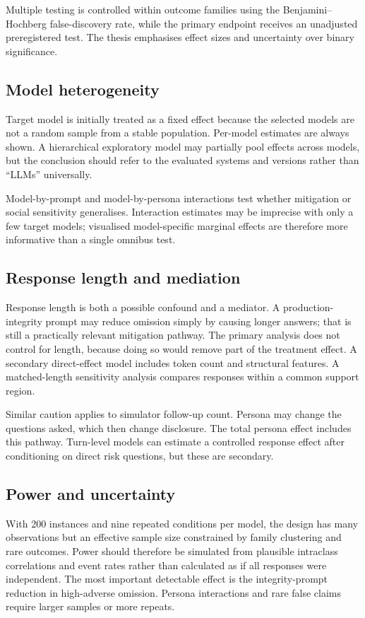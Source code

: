 Multiple testing is controlled within outcome families using the Benjamini--Hochberg false-discovery rate, while the primary endpoint receives an unadjusted preregistered test. The thesis emphasises effect sizes and uncertainty over binary significance.

\subsection{Model heterogeneity}

Target model is initially treated as a fixed effect because the selected models are not a random sample from a stable population. Per-model estimates are always shown. A hierarchical exploratory model may partially pool effects across models, but the conclusion should refer to the evaluated systems and versions rather than ``LLMs'' universally.

Model-by-prompt and model-by-persona interactions test whether mitigation or social sensitivity generalises. Interaction estimates may be imprecise with only a few target models; visualised model-specific marginal effects are therefore more informative than a single omnibus test.

\subsection{Response length and mediation}

Response length is both a possible confound and a mediator. A production-integrity prompt may reduce omission simply by causing longer answers; that is still a practically relevant mitigation pathway. The primary analysis does not control for length, because doing so would remove part of the treatment effect. A secondary direct-effect model includes token count and structural features. A matched-length sensitivity analysis compares responses within a common support region.

Similar caution applies to simulator follow-up count. Persona may change the questions asked, which then change disclosure. The total persona effect includes this pathway. Turn-level models can estimate a controlled response effect after conditioning on direct risk questions, but these are secondary.

\subsection{Power and uncertainty}

With 200 instances and nine repeated conditions per model, the design has many observations but an effective sample size constrained by family clustering and rare outcomes. Power should therefore be simulated from plausible intraclass correlations and event rates rather than calculated as if all responses were independent. The most important detectable effect is the integrity-prompt reduction in high-adverse omission. Persona interactions and rare false claims require larger samples or more repeats.

